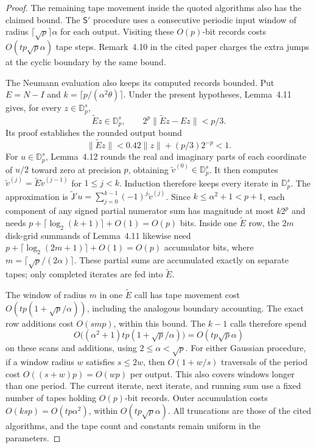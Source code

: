 \documentclass[11pt]{article}
\theoremstyle{definition}
\begin{document}
\begin{proof}
The remaining tape movement inside the quoted algorithms also has the
claimed bound. The $\mathsf S'$ procedure uses a consecutive periodic input
window of radius $\lceil\sqrt p\rceil\alpha$ for each output. Visiting
these $O(p)$-bit records costs $O(tp\sqrt p\alpha)$ tape steps.
Remark~4.10 in the cited paper charges the extra jumps at the cyclic
boundary by the same bound.

The Neumann evaluation also keeps its computed records bounded.
Put $E=N-I$ and $k=\lceil p/(\alpha^2\theta)\rceil$. Under the present
hypotheses, Lemma~4.11 gives, for every $z\in\mathbb D_p^s$,
\[
 \widetilde E z\in\mathbb D_p^s,\qquad
 2^p\|\widetilde E z-Ez\|<p/3.
\]
Its proof establishes the rounded output bound
\[
 \|\widetilde E z\|<0.42\|z\|+(p/3)2^{-p}<1.
\]
For $u\in\mathbb D_p^s$, Lemma~4.12 rounds the real and imaginary parts
of each coordinate of $u/2$ toward zero at precision $p$, obtaining
$\widetilde v^{(0)}\in\mathbb D_p^s$. It then computes
$\widetilde v^{(j)}=\widetilde E\widetilde v^{(j-1)}$
for $1\leq j<k$. Induction therefore keeps every iterate in
$\mathbb D_p^s$. The approximation is
$\widetilde{\mathsf J}'u=\sum_{j=0}^{k-1}(-1)^j\widetilde v^{(j)}$.
Since $k\leq\alpha^2+1<p+1$, each component of any signed partial
numerator sum has magnitude at most $k2^p$ and needs
$p+\lceil\log_2(k+1)\rceil+O(1)=O(p)$ bits. Inside one $\widetilde E$
row, the $2m$ disk-grid summands of Lemma~4.11 likewise need
$p+\lceil\log_2(2m+1)\rceil+O(1)=O(p)$ accumulator bits, where
$m=\lceil\sqrt p/(2\alpha)\rceil$. These partial sums are accumulated
exactly on separate tapes; only completed iterates are fed into
$\widetilde E$.

The window of radius $m$ in one $\widetilde E$ call has tape movement
cost $O(tp(1+\sqrt p/\alpha))$, including the analogous boundary
accounting. The exact row additions cost $O(smp)$, within this bound.
The $k-1$ calls therefore spend
\[
 O\bigl((\alpha^2+1)tp(1+\sqrt p/\alpha)\bigr)
 =O(tp\sqrt p\alpha)
\]
on these scans and additions, using $2\leq\alpha<\sqrt p$.
For either Gaussian procedure, if a window
radius $w$ satisfies $s\leq2w$, then $O(1+w/s)$ traversals of the period
cost $O((s+w)p)=O(wp)$ per output. This also covers windows longer than
one period. The current iterate, next iterate, and running sum use a
fixed number of tapes holding $O(p)$-bit records. Outer accumulation
costs $O(ksp)=O(tp\alpha^2)$, within $O(tp\sqrt p\alpha)$.
All truncations are those of the cited algorithms, and the tape count
and constants remain uniform in the parameters.
\end{proof}
\end{document}
